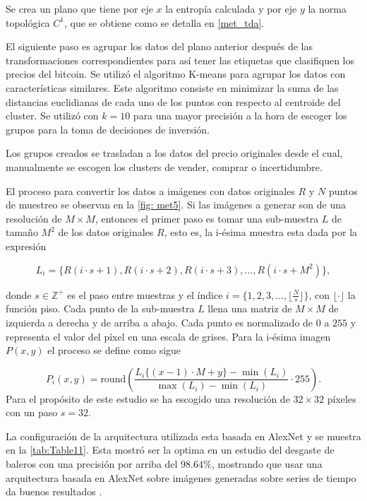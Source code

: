Se crea un plano que tiene por eje $x$ la entropía calculada y por eje $y$ la norma topológica $C^1$, que se obtiene como se detalla en \cref{met_tda}.


El siguiente paso es agrupar los datos del plano anterior después de las transformaciones correspondientes para así tener las etiquetas que clasifiquen los precios del bitcoin. Se utilizó el algoritmo K-means para agrupar los datos con características similares. Este algoritmo consiste en minimizar la suma de las distancias euclidianas de cada uno de los puntos con respecto al centroide del cluster. Se utilizó con $k=10$ para una mayor precisión a la hora de escoger los grupos para la toma de decisiones de inversión.

Los grupos creados se trasladan a los datos del precio originales desde el cual, manualmente se escogen los clusters de vender, comprar o incertidumbre.

El proceso para convertir los datos a imágenes con datos originales $R$ y $N$ puntos de muestreo se observan en la \cref{fig: met5}.  Si las imágenes a generar son de una resolución de $M \times M$, entonces el primer paso es tomar una sub-muestra $L$ de tamaño $M^2$ de los datos originales $R$, esto es, la i-ésima muestra esta dada por la expresión 

\[ L_i = \{R(i\cdot s+1),R(i\cdot s+2),R(i\cdot s+3),...,R(i\cdot s+M^2)\}, \]

donde $s\in \mathbb{Z}^+$ es el paso entre muestras y el índice $i = \{1,2,3,...,  \lfloor\frac{N}{s}\rfloor\}$, con $\lfloor \cdot \rfloor$ la función piso. Cada punto de la sub-muestra $L$ llena una matriz de $M\times M$ de izquierda a derecha y de arriba a abajo. Cada punto es normalizado de $0$ a $255$ y representa el valor del píxel en una escala de grises. Para la i-ésima imagen $P(x,y)$ el proceso se define como sigue

\[ P_i(x,y) =  \textrm{round}\left(\frac{L_i\{(x-1)\cdot M+y\}-\min(L_i)}{\max(L_i)-\min(L_i)}\cdot 255\right).\]
Para el propósito de este estudio se ha escogido una resolución de $32\times 32$ píxeles con un paso $s = 32$.    

La configuración de la arquitectura utilizada esta basada en AlexNet y se muestra en la \cref{tab:Table11}. Esta mostró ser la optima en un estudio del desgaste de baleros con una precisión por arriba del $98.64\%$, mostrando que usar una arquitectura basada en AlexNet sobre imágenes generadas sobre series de tiempo da buenos resultados \parencite{pinedo-sanchezVibrationAnalysisBearings2020}. 


